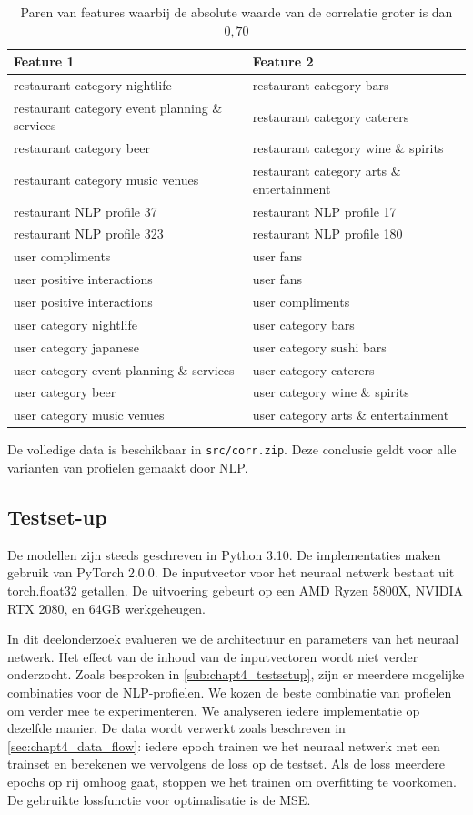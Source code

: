 \begin{table}[H]
    \centering
    \begin{tabular}{l|l}
    Feature 1 & Feature 2 \\ \hline
    restaurant category nightlife & restaurant category bars \\
    restaurant category event planning \& services & restaurant category caterers \\
    restaurant category beer & restaurant category wine \& spirits \\
    restaurant category music venues & restaurant category arts \& entertainment \\
    restaurant NLP profile 37 & restaurant NLP profile 17 \\
    restaurant NLP profile 323 & restaurant NLP profile 180 \\
    user compliments & user fans \\
    user positive interactions & user fans \\
    user positive interactions & user compliments \\
    user category nightlife & user category bars \\
    user category japanese & user category sushi bars \\
    user category event planning \& services & user category caterers \\
    user category beer & user category wine \& spirits \\
    user category music venues & user category arts \& entertainment \\
    \end{tabular}
    \caption{Paren van features waarbij de absolute waarde van de correlatie groter is dan $0,70$}
    \label{}
\end{table}

De volledige data is beschikbaar in \verb|src/corr.zip|. Deze conclusie geldt voor alle varianten van profielen gemaakt door NLP.

\subsection{Testset-up}
De modellen zijn steeds geschreven in Python 3.10. De implementaties maken gebruik van PyTorch 2.0.0. \cite{pytorch} De inputvector voor het neuraal netwerk bestaat uit \verb||torch.float32 getallen. De uitvoering gebeurt op een AMD Ryzen 5800X, NVIDIA RTX 2080, en 64GB werkgeheugen.

In dit deelonderzoek evalueren we de architectuur en parameters van het neuraal netwerk. Het effect van de inhoud van de inputvectoren wordt niet verder onderzocht. Zoals besproken in \autoref{sub:chapt4_testsetup}, zijn er meerdere mogelijke combinaties voor de NLP-profielen. We kozen de beste combinatie van profielen om verder mee te experimenteren. We analyseren iedere implementatie op dezelfde manier. De data wordt verwerkt zoals beschreven in \autoref{sec:chapt4_data_flow}: iedere epoch trainen we het neuraal netwerk met een trainset en berekenen we vervolgens de loss op de testset. Als de loss meerdere epochs op rij omhoog gaat, stoppen we het trainen om overfitting te voorkomen. De gebruikte lossfunctie voor optimalisatie is de MSE.


